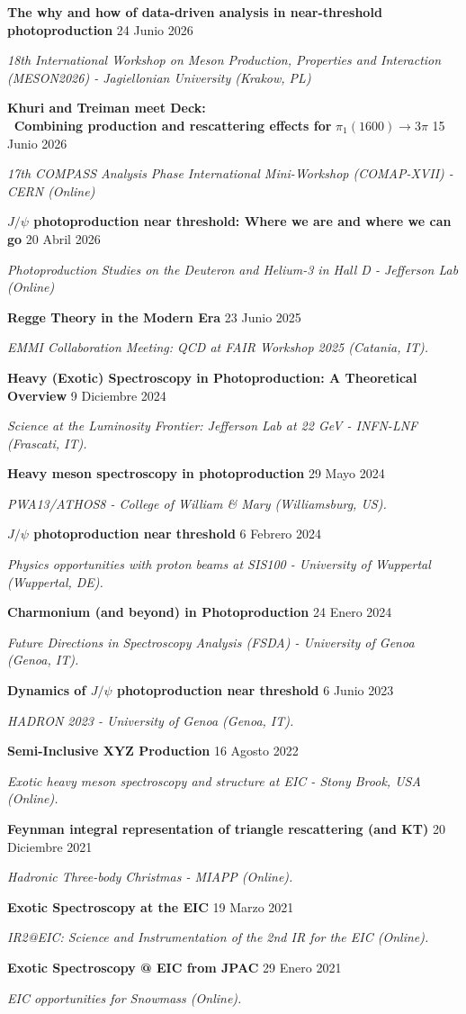 \documentclass[letterpaper,11pt]{article}
\newcommand{\entrymid}[4][]{
    \item[#1] \small{#2} \hfill \small{#3}
    \vspace{-\smallskipamount} \item[]\small{\textit{#4}}}
\begin{document}
{
    \entrymid[\textbullet]
    {\textbf{The why and how of data-driven analysis in near-threshold photoproduction }}{24 Junio 2026}{18th International Workshop on Meson Production, Properties and Interaction (MESON2026) - Jagiellonian University (Krakow, PL)   
    }

    \entrymid[\textbullet]
    {\textbf{ Khuri and Treiman meet Deck: \\
    \, Combining production and rescattering effects for} $\pi_1(1600) \to 3\pi$}{15 Junio 2026}{17th COMPASS Analysis Phase International Mini-Workshop (COMAP-XVII) - CERN (Online)   
    }

    \entrymid[\textbullet]
    {\textbf{$J/\psi$ photoproduction near threshold: Where we are and where we can go}}{20 Abril 2026}{Photoproduction Studies on the Deuteron and Helium-3 in Hall D - Jefferson Lab (Online)   
    }

    \entrymid[\textbullet]
    {\textbf{Regge Theory in the Modern Era
    }}{23 Junio 2025}{EMMI Collaboration Meeting: QCD at FAIR Workshop 2025 (Catania, IT). 
    }

    \entrymid[\textbullet]
    {\textbf{Heavy (Exotic) Spectroscopy in Photoproduction: A Theoretical Overview
    }}{9 Diciembre 2024}{Science at the Luminosity Frontier: Jefferson Lab at 22 GeV - INFN-LNF (Frascati, IT). 
    }

    \entrymid[\textbullet]
    {\textbf{Heavy meson spectroscopy in photoproduction}}{29 Mayo 2024}{PWA13/ATHOS8 - College of William \& Mary (Williamsburg, US). 
    }

    \entrymid[\textbullet]
    {\textbf{$J/\psi$ photoproduction near threshold}}{6 Febrero 2024}{Physics opportunities with proton beams at SIS100 - University of Wuppertal (Wuppertal, DE). 
    }

    \entrymid[\textbullet]
    {\textbf{Charmonium (and beyond) in Photoproduction}}{24 Enero 2024}{Future Directions in Spectroscopy Analysis (FSDA) - University of Genoa (Genoa, IT). 
    }

    \entrymid[\textbullet]
    {\textbf{Dynamics of $J/\psi$ photoproduction near threshold}}{6 Junio 2023}{HADRON 2023 - University of Genoa (Genoa, IT). 
    }

    \entrymid[\textbullet]
    {\textbf{Semi-Inclusive XYZ Production}}{16 Agosto 2022}{Exotic heavy meson spectroscopy and structure at EIC - Stony Brook, USA (Online). 
    }

    \entrymid[\textbullet]
    {\textbf{Feynman integral representation of triangle rescattering (and KT)
    }}{20 Diciembre 2021}{Hadronic Three-body Christmas
    - MIAPP (Online).
    }

    \entrymid[\textbullet]
    {\textbf{Exotic Spectroscopy at the EIC}}{19 Marzo 2021}{IR2@EIC: Science and Instrumentation of the 2nd IR for the EIC (Online).
    }

    \entrymid[\textbullet]
    {\textbf{Exotic Spectroscopy @ EIC from JPAC}}{29 Enero 2021}{EIC opportunities for Snowmass (Online).
    }
}
\end{document}
